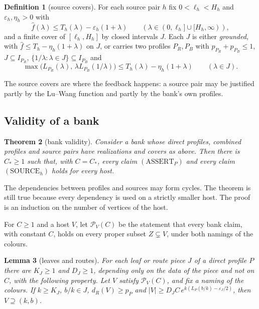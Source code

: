 \documentclass[11pt]{article}
\newtheorem{theorem}{Theorem}[section]
\newtheorem{lemma}[theorem]{Lemma}
\theoremstyle{definition}
\newtheorem{definition}[theorem]{Definition}
\theoremstyle{remark}
\newcommand{\fh}{\widehat f}
\begin{document}
\begin{definition}[source covers]
For each source pair $h$ fix $0<\ell_h<H_h$ and $\varepsilon_h,\eta_h>0$ with
\begin{equation}\label{eq:tail}
\fh(\lambda)\le T_h(\lambda)-\varepsilon_h(1+\lambda)\qquad(\lambda\in(0,\ell_h]\cup[H_h,\infty)),
\end{equation}
and a finite cover of $[\ell_h,H_h]$ by closed intervals $J$. Each $J$ is either \emph{grounded}, with
$\fh\le T_h-\eta_h(1+\lambda)$ on $J$, or carries two profiles $P_R,P_B$ with $p_{P_R}+p_{P_B}\le1$, $J\subseteq I_{P_R}$,
$\{1/\lambda:\lambda\in J\}\subseteq I_{P_B}$ and
\[
\max\big(L_{P_R}(\lambda),\,\lambda L_{P_B}(1/\lambda)\big)\le T_h(\lambda)-\eta_h(1+\lambda)\qquad(\lambda\in J).
\]
\end{definition}

The source covers are where the feedback happens: a source pair may be justified partly by the Lu--Wang function and
partly by the bank's own profiles.

\subsection{Validity of a bank}

\begin{theorem}[bank validity]\label{thm:bank}
Consider a bank whose direct profiles, combined profiles and source pairs have realizations and covers as above. Then there
is $C_*\ge1$ such that, with $C=C_*$, every claim $(\mathrm{ASSERT}_P)$ and every claim $(\mathrm{SOURCE}_h)$ holds for
every host.
\end{theorem}

The dependencies between profiles and sources may form cycles. The theorem is still true because every dependency is
used on a strictly smaller host. The proof is an induction on the number of vertices of the host.

For $C\ge1$ and a host $V$, let $\mathcal P_V(C)$ be the statement that every bank claim, with constant $C$, holds on
every proper subset $Z\subsetneq V$, under both namings of the colours.

\begin{lemma}[leaves and routes]\label{lem:leafroute}
For each leaf or route piece $J$ of a direct profile $P$ there are $K_J\ge1$ and $D_J\ge1$, depending only on the data of
the piece and not on $C$, with the following property. Let $V$ satisfy $\mathcal P_V(C)$, and fix a naming of the
colours. If $k\ge K_J$, $b/k\in J$, $d_R(V)\ge p_P$ and $|V|\ge D_JC\,e^{k(L_P(b/k)-\varepsilon_J/2)}$, then
$V\supseteq(k,b)$.
\end{lemma}
\end{document}
